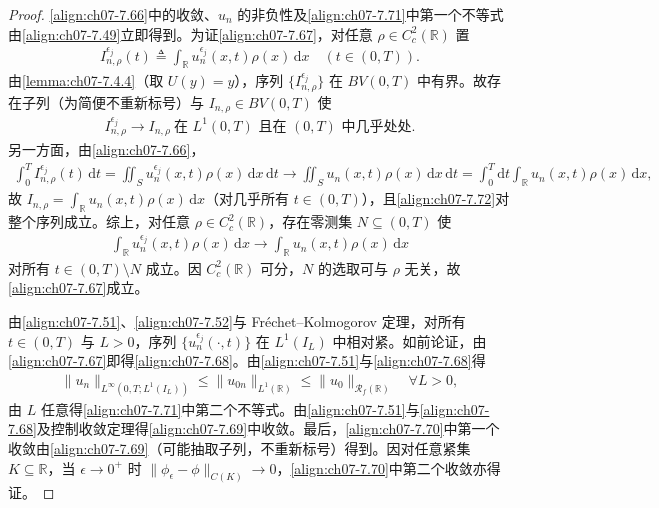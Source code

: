 \documentclass[../../main.tex]{subfiles}%
\begin{document}
\begin{proof}
\eqref{align:ch07-7.66}中的收敛、$u_n$ 的非负性及\eqref{align:ch07-7.71}中第一个不等式由\eqref{align:ch07-7.49}立即得到。为证\eqref{align:ch07-7.67}，对任意 $\rho\in C^2_c(\mathbb{R})$ 置
\begin{align*}
I_{n,\rho}^{\epsilon_j}(t)\triangleq \int_{\mathbb{R}}u_n^{\epsilon_j}(x,t)\rho(x)\,\mathrm{d}x\quad(t\in(0,T)).
\end{align*}
由\cref{lemma:ch07-7.4.4}（取 $U(y)=y$），序列 $\{I_{n,\rho}^{\epsilon_j}\}$ 在 $BV(0,T)$ 中有界。故存在子列（为简便不重新标号）与 $I_{n,\rho}\in BV(0,T)$ 使
\begin{align}
I_{n,\rho}^{\epsilon_j}\to I_{n,\rho}\ \text{在 }L^1(0,T)\text{ 且在 }(0,T)\text{ 中几乎处处}. \label{align:ch07-7.72}
\end{align}
另一方面，由\eqref{align:ch07-7.66}，
\begin{align*}
\int_0^T I_{n,\rho}^{\epsilon_j}(t)\,\mathrm{d}t=\iint_S u_n^{\epsilon_j}(x,t)\rho(x)\,\mathrm{d}x\,\mathrm{d}t
\to\iint_S u_n(x,t)\rho(x)\,\mathrm{d}x\,\mathrm{d}t=\int_0^T\mathrm{d}t\int_{\mathbb{R}}u_n(x,t)\rho(x)\,\mathrm{d}x,
\end{align*}
故 $I_{n,\rho}=\int_{\mathbb{R}}u_n(x,t)\rho(x)\,\mathrm{d}x$（对几乎所有 $t\in(0,T)$），且\eqref{align:ch07-7.72}对整个序列成立。综上，对任意 $\rho\in C^2_c(\mathbb{R})$，存在零测集 $N\subseteq(0,T)$ 使
\begin{align*}
\int_{\mathbb{R}}u_n^{\epsilon_j}(x,t)\rho(x)\,\mathrm{d}x\to\int_{\mathbb{R}}u_n(x,t)\rho(x)\,\mathrm{d}x
\end{align*}
对所有 $t\in(0,T)\setminus N$ 成立。因 $C^2_c(\mathbb{R})$ 可分，$N$ 的选取可与 $\rho$ 无关，故\eqref{align:ch07-7.67}成立。

由\eqref{align:ch07-7.51}、\eqref{align:ch07-7.52}与 Fréchet--Kolmogorov 定理，对所有 $t\in(0,T)$ 与 $L>0$，序列 $\{u_n^{\epsilon_j}(\cdot,t)\}$ 在 $L^1(I_L)$ 中相对紧。如前论证，由\eqref{align:ch07-7.67}即得\eqref{align:ch07-7.68}。由\eqref{align:ch07-7.51}与\eqref{align:ch07-7.68}得
\begin{align*}
\|u_n\|_{L^\infty(0,T;L^1(I_L))}\leqslant\|u_{0n}\|_{L^1(\mathbb{R})}\leqslant\|u_0\|_{\mathscr{R}_f(\mathbb{R})}\quad\forall L>0,
\end{align*}
由 $L$ 任意得\eqref{align:ch07-7.71}中第二个不等式。由\eqref{align:ch07-7.51}与\eqref{align:ch07-7.68}及控制收敛定理得\eqref{align:ch07-7.69}中收敛。最后，\eqref{align:ch07-7.70}中第一个收敛由\eqref{align:ch07-7.69}（可能抽取子列，不重新标号）得到。因对任意紧集 $K\subseteq\mathbb{R}$，当 $\epsilon\to0^+$ 时 $\|\phi_\epsilon-\phi\|_{C(K)}\to0$，\eqref{align:ch07-7.70}中第二个收敛亦得证。
\end{proof}
\end{document}
